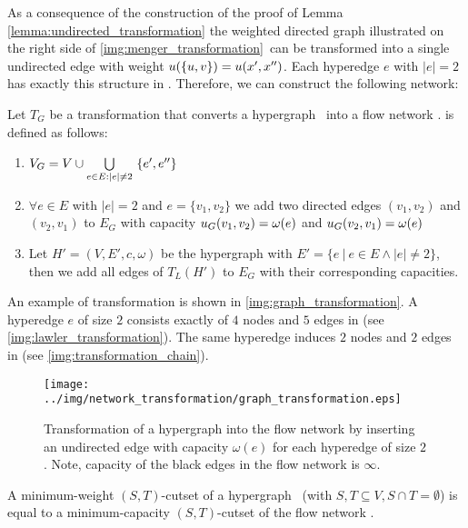 As a consequence of the construction of the proof of Lemma \ref{lemma:undirected_transformation}
the weighted directed graph illustrated on the right side of
\autoref{img:menger_transformation}~can be transformed into a single undirected edge with weight
$u(\{u,v\}) = u(x',x'')$.
Each hyperedge $e$ with $|e| = 2$ has exactly this structure in . Therefore, we can 
construct the following network:

\begin{definition}
Let $T_G$ be a transformation that converts a hypergraph \HypergraphDef~into 
a flow network .  is defined as follows:
\begin{enumerate}
\item $V_G = V \cup \bigcup\limits_{\substack{e \in E: |e| \neq 2}}\ \{e', e''\}$
\item $\forall e \in E$ with $|e| = 2$ and $e = \{v_1,v_2\}$ we add 
      two directed edges $(v_1,v_2)$ and $(v_2,v_1)$ to $E_G$ with capacity $u_G(v_1,v_2) = \omega(e)$
      and $u_G(v_2,v_1) = \omega(e)$
\item Let $H' = (V,E',c,\omega)$ be the hypergraph with $E' = \{e\ |\ e \in E \land |e| \neq 2\}$,
      then we add all edges of $T_L(H')$ to $E_G$ with their corresponding capacities.
\end{enumerate} 
\end{definition}

An example of transformation  is shown in \autoref{img:graph_transformation}. A hyperedge
$e$ of size $2$ consists exactly of $4$ nodes and $5$ edges in  (see \autoref{img:lawler_transformation}).
The same hyperedge induces $2$ nodes and $2$ edges in  (see \autoref{img:transformation_chain}). 
 
\begin{figure}
\centering
\texttt{[image: ../img/network\_transformation/graph\_transformation.eps]}
\caption{Transformation of a hypergraph into the flow network  by inserting 
         an undirected edge with capacity $\omega(e)$ for each hyperedge of size $2$. 
         Note, capacity of the black edges in the flow network is $\infty$.}
\label{img:graph_transformation}
\end{figure}

\begin{theorem}
A minimum-weight $(S,T)$-cutset of a hypergraph \HypergraphDef~(with $S,T \subseteq V,
S \cap T = \emptyset$) is equal to a minimum-capacity $(S,T)$-cutset of the
flow network .
\label{theorem:graph_transformation}
\end{theorem}


